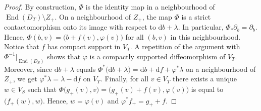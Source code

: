 \documentclass[10pt,a4paper]{amsart}
\DeclareMathOperator{\End}{\mathrm{End}}
\newcommand{\rmd}{\mathrm d}
\begin{document}
\begin{proof}
  By construction,
  $\Phi$ is the identity map
  in a neighbourhood of $\End(D_T)\setminus Z_+$.
  On a neighbourhood of $Z_+$,
  the map $\Phi$ is a strict contactomorphism
  onto its image with respect to $\rmd b+\lambda$.
  In particular, $\Phi_*\partial_b=\partial_b$.
  Hence,
  $\Phi(b,v)=\big(b+f(v),\varphi(v)\big)$
  for all $(b,v)$ in this neighbourhood.
  Notice that $f$ has compact support in $V_T$.
  A repetition of the argument with $\Phi^{-1}|_{\End(D_S)}$
  shows that $\varphi$ is a compactly supported
  diffeomorphism of $V_T$.
  Moreover, since $\rmd b+\lambda$ equals
  $\Phi^*\big(\rmd b+\lambda\big)=\rmd b+\rmd f+\varphi^*\lambda$
  on a neighbourhood of $Z_+$,
  we get $\varphi^*\lambda=\lambda-\rmd f$ on $V_T$.
  Finally,
  for all $v\in V_T$ there exists a unique $w\in V_S$
  such that $\Phi\big(g_+(v),v\big)=\big(g_+(v)+f(v),\varphi(v)\big)$
  is equal to $\big(f_+(w),w\big)$.
  Hence,
  $w=\varphi(v)$ and $\varphi^*f_+=g_++f$.
\end{proof}
\end{document}
